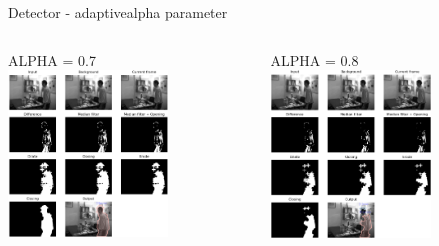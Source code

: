 \documentclass{beamer}
\begin{document}
\begin{frame}{Detector - adaptive}{alpha parameter}
    \begin{columns}
        \begin{column}[t]{0.5\textwidth}
            \centering
            ALPHA = 0.7    
            \includegraphics[width=120pt,keepaspectratio]{adaptive_alpha07_f482.png}
        \end{column}
        \begin{column}[t]{0.5\textwidth}
            \centering
            ALPHA = 0.8    
            \includegraphics[width=120pt,keepaspectratio]{adaptive_alpha08_f482.png}
        \end{column}
    \end{columns}
\end{frame}
\end{document}
